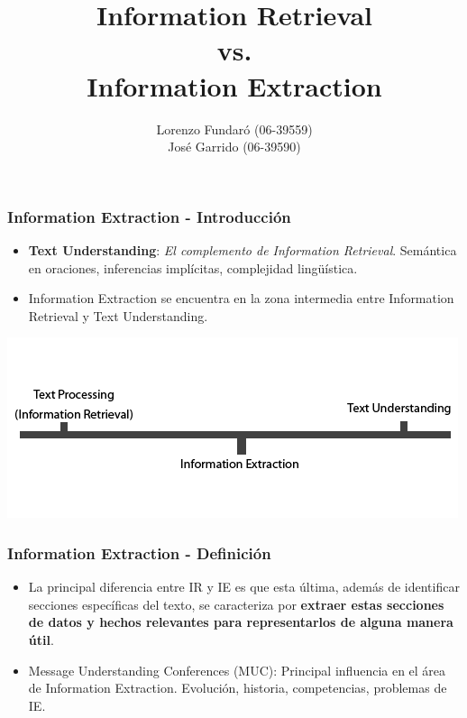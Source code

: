 \documentclass[xcolor=dvipsnames]{beamer}
\author{Lorenzo Fundaró (06-39559)\\ José Garrido (06-39590)}
\title{Information Retrieval \\vs. \\Information Extraction}
\institute{Universidad Simón Bolívar\\Inteligencia Artificial 2}
\begin{document}
\begin{frame}
\titlepage
\end{frame}


\begin{frame}
\frametitle{Information Extraction - Introducción}
\begin{itemize}
 \item \textbf{Text Understanding}: \emph{El complemento de Information Retrieval}. Semántica en oraciones, inferencias implícitas, complejidad lingüística.
 \item Information Extraction se encuentra en la zona intermedia entre Information Retrieval y Text Understanding.
\end{itemize}
\begin{center}
\includegraphics[scale=0.4]{IEandIR.png}
\end{center}
\end{frame}

\begin{frame}
\frametitle{Information Extraction - Definición}
\begin{itemize}
 \item La principal diferencia entre IR y IE es que esta última, además de identificar secciones específicas del texto, se caracteriza por \textbf{extraer estas secciones de datos y hechos relevantes para representarlos de alguna manera útil}.
 \item Message Understanding Conferences (MUC): Principal influencia en el área de Information Extraction. Evolución, historia, competencias, problemas de IE.
\end{itemize}
\end{frame}
\end{document}
